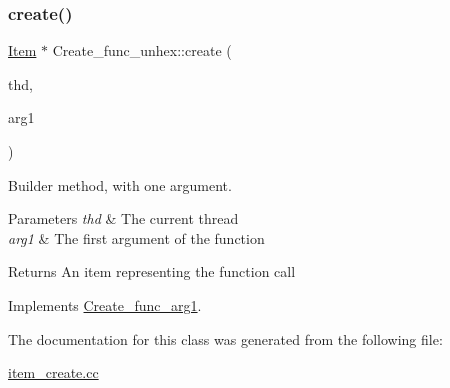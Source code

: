 \subsubsection{\texorpdfstring{create()}{create()}}
{\footnotesize\ttfamily \mbox{\hyperlink{classItem}{Item}} $\ast$ Create\+\_\+func\+\_\+unhex\+::create (\begin{DoxyParamCaption}\item[{T\+HD $\ast$}]{thd,  }\item[{\mbox{\hyperlink{classItem}{Item}} $\ast$}]{arg1 }\end{DoxyParamCaption})\hspace{0.3cm}{\ttfamily [virtual]}}

Builder method, with one argument. 
\begin{DoxyParams}{Parameters}
{\em thd} & The current thread \\
\hline
{\em arg1} & The first argument of the function \\
\hline
\end{DoxyParams}
\begin{DoxyReturn}{Returns}
An item representing the function call 
\end{DoxyReturn}


Implements \mbox{\hyperlink{classCreate__func__arg1_a3e9a98f755cd82c3e762e334c955a8c9}{Create\+\_\+func\+\_\+arg1}}.



The documentation for this class was generated from the following file\+:\begin{DoxyCompactItemize}
\item 
\mbox{\hyperlink{item__create_8cc}{item\+\_\+create.\+cc}}\end{DoxyCompactItemize}
